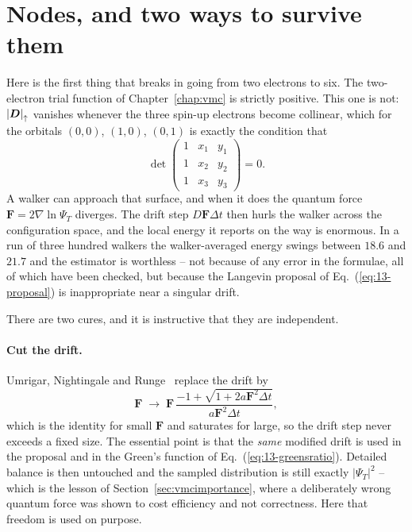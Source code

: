 \section{Nodes, and two ways to survive them}
\label{sec:appnodes}

Here is the first thing that breaks in going from two electrons to six.  The
two-electron trial function of Chapter~\ref{chap:vmc} is strictly positive.
This one is not: ${|\boldsymbol{D}|}_{\uparrow}$ vanishes whenever the three spin-up
electrons become collinear, which for the orbitals $(0,0)$, $(1,0)$, $(0,1)$ is
exactly the condition that
\begin{equation}
  \det\begin{pmatrix}
    1 & x_1 & y_1\\ 1 & x_2 & y_2\\ 1 & x_3 & y_3
  \end{pmatrix} = 0 .
  \label{eq:16-node}
\end{equation}
A walker can approach that surface, and when it does the quantum force
$\bm{F}=2\nabla\ln\Psi_T$ diverges.  The drift step $D\bm{F}\Delta t$ then
hurls the walker across the configuration space, and the local energy it
reports on the way is enormous.  In a run of three hundred walkers the
walker-averaged energy swings between $18.6$ and $21.7$ and the estimator is
worthless -- not because of any error in the formulae, all of which have been
checked, but because the Langevin proposal of Eq.~(\ref{eq:13-proposal}) is
inappropriate near a singular drift.

There are two cures, and it is instructive that they are independent.

\paragraph{Cut the drift.}
Umrigar, Nightingale and Runge~\cite{umrigar1993} replace the drift by
\begin{equation}
  \bm{F} \;\longrightarrow\;
  \bm{F}\,\frac{-1+\sqrt{1+2a\bm{F}^2\Delta t}}{a\bm{F}^2\Delta t},
  \label{eq:16-driftcutoff}
\end{equation}
which is the identity for small $\bm{F}$ and saturates for large, so the drift
step never exceeds a fixed size.  The essential point is that the \emph{same}
modified drift is used in the proposal and in the Green's function of
Eq.~(\ref{eq:13-greensratio}).  Detailed balance is then untouched and the
sampled distribution is still exactly $|\Psi_T|^2$ -- which is the lesson of
Section~\ref{sec:vmcimportance}, where a deliberately wrong quantum force was
shown to cost efficiency and not correctness.  Here that freedom is used on
purpose.

